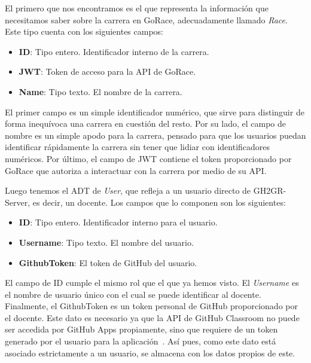 El primero que nos encontramos es el que representa la información que necesitamos saber sobre la carrera en GoRace, adecuadamente llamado \textit{Race}. Este tipo cuenta con los siguientes campos:
\begin{itemize}
    \item \textbf{ID}: Tipo entero. Identificador interno de la carrera.
    \item \textbf{JWT}: Token de acceso para la API de GoRace.
    \item \textbf{Name}: Tipo texto. El nombre de la carrera.
\end{itemize}

El primer campo es un simple identificador numérico, que sirve para distinguir de forma inequívoca una carrera en cuestión del resto. Por su lado, el campo de nombre es un simple apodo para la carrera, pensado para que los usuarios puedan identificar rápidamente la carrera sin tener que lidiar con identificadores numéricos. Por último, el campo de \acrshort{JWT} contiene el token proporcionado por GoRace que autoriza a interactuar con la carrera por medio de su \acrshort{API}.

Luego tenemos el \acrshort{ADT} de \textit{User}, que refleja a un usuario directo de GH2GR-Server, es decir, un docente. Los campos que lo componen son los siguientes:
\begin{itemize}
    \item \textbf{ID}: Tipo entero. Identificador interno para el usuario.
    \item \textbf{Username}: Tipo texto. El nombre del usuario.
    \item \textbf{GithubToken}: El token de GitHub del usuario.
\end{itemize}
El campo de ID cumple el mismo rol que el que ya hemos visto. El \textit{Username} es el nombre de usuario único con el cual se puede identificar al docente. Finalmente, el GithubToken es un token personal de GitHub proporcionado por el docente. Este dato es necesario ya que la \acrshort{API} de GitHub Classroom no puede ser accedida por GitHub Apps propiamente, sino que requiere de un token generado por el usuario para la aplicación~\cite{ClassroomAPI}. Así pues, como este dato está asociado estrictamente a un usuario, se almacena con los datos propios de este.


